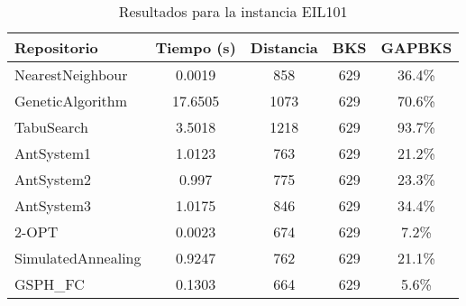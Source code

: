 \begin{table}[H]
\centering
\caption{Resultados para la instancia EIL101}
\begin{tabular}{|l|c|c|c|c|}
\hline
\textbf{Repositorio} & \textbf{Tiempo (s)} & \textbf{Distancia} & \textbf{BKS} & \textbf{GAPBKS} \\ 
\hline
NearestNeighbour & 0.0019 & 858 & 629 & 36.4\% \\ 
GeneticAlgorithm & 17.6505 & 1073 & 629 & 70.6\% \\ 
TabuSearch & 3.5018 & 1218 & 629 & 93.7\% \\ 
AntSystem1 & 1.0123 & 763 & 629 & 21.2\% \\ 
AntSystem2 & 0.997 & 775 & 629 & 23.3\% \\ 
AntSystem3 & 1.0175 & 846 & 629 & 34.4\% \\ 
2-OPT & 0.0023 & 674 & 629 & 7.2\% \\ 
SimulatedAnnealing & 0.9247 & 762 & 629 & 21.1\% \\ 
GSPH_FC & 0.1303 & 664 & 629 & 5.6\% \\ 
\hline
\end{tabular}
\end{table}
